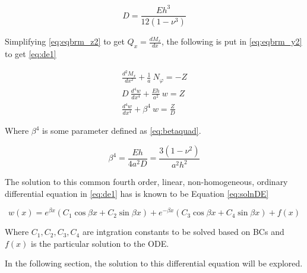 \begin{equation}
	\label{eq:flexrig}
	D = \frac{Eh^3}{12(1-\nu^3)}
\end{equation}

Simplifying \ref{eq:eqbrm_z2} to get $Q_x = \frac{dM_x}{dx}$, the following is put in \ref{eq:eqbrm_y2} to get \ref{eq:de1}

\begin{equation}
	\label{eq:de1}
	\begin{aligned}
	\frac{d^2M_x}{dx^2}+\frac{1}{a} \ N_\varphi = -Z\\
	D\ \frac{d^4w}{dx^4}+\frac{Eh}{a^2} \ w = Z\\
	\frac{d^4w}{dx^4}+\beta^4 \ w = \frac{Z}{D}
	\end{aligned}
\end{equation} 

Where $\beta^4$ is some parameter defined as \ref{eq:betaquad}.

\begin{equation}
	\label{eq:betaquad}
	\beta^4 = \frac{Eh}{4a^2D}= \frac{3(1-\nu^2)}{a^2h^2}
\end{equation}

The solution to this common fourth order, linear, non-homogeneous, ordinary differential equation in \ref{eq:de1} has is known to be Equation \ref{eq:solnDE}

\begin{equation}
	\label{eq:solnDE}
	w(x)=e^{\beta x} \left(C_1 \cos \beta x +C_2 \sin \beta x \right)+e^{-\beta x} \left(C_3 \cos \beta x +C_4 \sin \beta x \right) +f(x)
\end{equation}

Where $ C_1, C_2, C_3, C_4$ are intgration constants to be solved based on BCs and $f(x)$ is the particular solution to the ODE.

In the following section, the solution to this differential equation will be explored.
